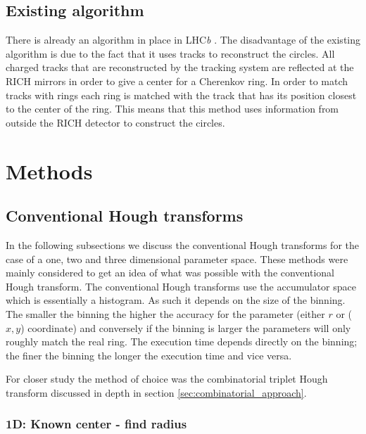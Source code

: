 \documentclass[11pt,twoside]{scrreprt}
\begin{document}
\section{Existing algorithm} %
\label{sub:existing_algorithm}
There is already an algorithm in place in LHC\textit{b} \cite{Forty1999}. The disadvantage of the existing algorithm is due to the 
fact that it uses tracks to reconstruct the circles. All charged tracks that are reconstructed by the tracking system are reflected at
the RICH mirrors in order to give a center for a Cherenkov ring. In order to match tracks with rings each ring is matched with the track 
that has its position closest to the center of the ring. This means that this method uses information from outside the RICH detector 
to construct the circles.


\chapter{Methods}

\section{Conventional Hough transforms} %
\label{sec:conventional_hough_transforms}

In the following subsections we discuss the conventional Hough transforms for the case of a one, two and three dimensional parameter space. 
These methods were mainly considered to get an idea of what was possible with the conventional Hough transform.
The conventional Hough transforms use the accumulator space which is essentially a histogram. As such it depends on the size of the binning. The smaller the binning the higher the accuracy for the parameter (either $r$ or ($x,y$) coordinate) and conversely if the binning is larger the parameters will only roughly match the real ring. The execution time depends directly on the binning; the finer the binning the longer the execution time and vice versa.

For closer study the 
method of choice was the combinatorial triplet Hough transform discussed in depth in section \ref{sec:combinatorial_approach}.

\subsection{1D: Known center - find radius} %
\label{sub:1d_known_center_find_radius}
\end{document}
